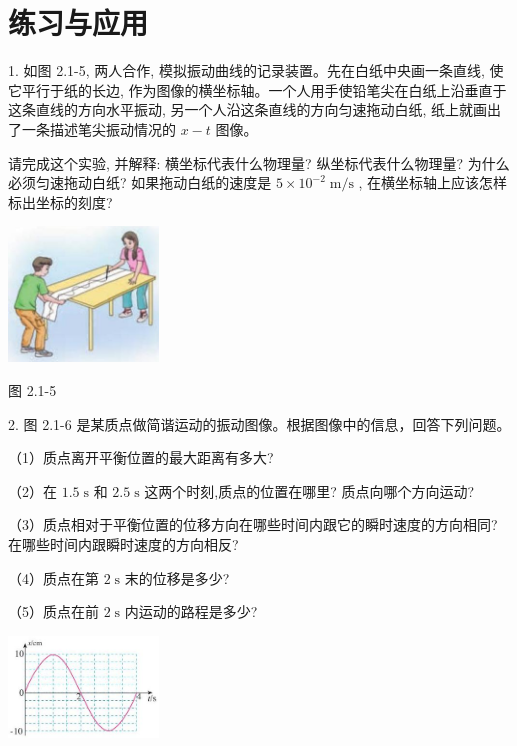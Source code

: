 \documentclass[10pt]{article}
\begin{document}
\section*{练习与应用}

1. 如图 2.1-5, 两人合作, 模拟振动曲线的记录装置。先在白纸中央画一条直线, 使它平行于纸的长边, 作为图像的横坐标轴。一个人用手使铅笔尖在白纸上沿垂直于这条直线的方向水平振动, 另一个人沿这条直线的方向匀速拖动白纸, 纸上就画出了一条描述笔尖振动情况的 \(x - t\) 图像。

请完成这个实验, 并解释: 横坐标代表什么物理量? 纵坐标代表什么物理量? 为什么必须匀速拖动白纸? 如果拖动白纸的速度是 \(5 \times {10}^{-2}\mathrm{\;m}/\mathrm{s}\) , 在横坐标轴上应该怎样标出坐标的刻度?

\begin{center}
\includegraphics[max width=0.3\textwidth]{images/01910e4c-ebb8-7d2c-8f2f-2375bc1d2d12_40_206485.jpg}
\end{center}

图 2.1-5

2. 图 2.1-6 是某质点做简谐运动的振动图像。根据图像中的信息，回答下列问题。

（1）质点离开平衡位置的最大距离有多大?

（2）在 \({1.5}\mathrm{\;s}\) 和 \({2.5}\mathrm{\;s}\) 这两个时刻,质点的位置在哪里? 质点向哪个方向运动?

（3）质点相对于平衡位置的位移方向在哪些时间内跟它的瞬时速度的方向相同? 在哪些时间内跟瞬时速度的方向相反?

（4）质点在第 \(2\mathrm{\;s}\) 末的位移是多少?

（5）质点在前 \(2\mathrm{\;s}\) 内运动的路程是多少?

\begin{center}
\includegraphics[max width=0.3\textwidth]{images/01910e4c-ebb8-7d2c-8f2f-2375bc1d2d12_40_146298.jpg}
\end{center}
\end{document}
